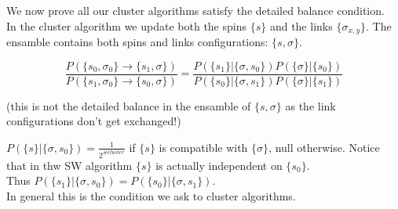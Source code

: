 \documentclass[12pt,handout]{beamer}
\begin{document}
\begin{frame}
\begin{center}
We now prove all our cluster algorithms satisfy the detailed balance condition.\\

In the cluster algorithm we update both the spins $\lbrace s \rbrace$ and the links $\lbrace \sigma_{x, y} \rbrace$. The ensamble contains both spins and links configurations: $\lbrace s,  \sigma \rbrace$.

\[
\frac{P \left( \lbrace s_0, \sigma_0 \rbrace \rightarrow \lbrace s_1, \sigma \rbrace \right)}{ P \left( \lbrace s_1, \sigma_0 \rbrace \rightarrow \lbrace s_0, \sigma \rbrace \right)} = \frac{P \left( \lbrace s_1 \rbrace | \lbrace \sigma, s_0 \rbrace \right) P \left( \lbrace \sigma \rbrace | \lbrace s_0 \rbrace \right) }{ P \left( \lbrace s_0 \rbrace | \lbrace \sigma, s_1 \rbrace \right) P \left( \lbrace \sigma \rbrace | \lbrace s_1 \rbrace \right) }
\]

(this is not the detailed balance in the ensamble of $\lbrace s,  \sigma \rbrace$ as the link configurations don't get exchanged!)


\end{center}
\end{frame}

\begin{frame}
\begin{center}
\vspace{20pt}
$P \left( \lbrace s \rbrace | \lbrace \sigma, s_0 \rbrace \right) =
 \frac{1}{2^{\# cluster}}$ if $\lbrace s \rbrace$ is compatible with $\lbrace \sigma \rbrace$, null otherwise. Notice that in thw SW algorithm $\lbrace s \rbrace$ is actually independent on $\lbrace s_0 \rbrace$.\\
\vspace{20pt} 
Thus {\large $P \left( \lbrace s_1 \rbrace | \lbrace \sigma, s_0 \rbrace \right) = P \left( \lbrace s_0 \rbrace | \lbrace \sigma, s_1 \rbrace \right)$}.\\
\vspace{20pt}
In general this is the condition we ask to cluster algorithms.




\end{center}
\end{frame}
\end{document}
